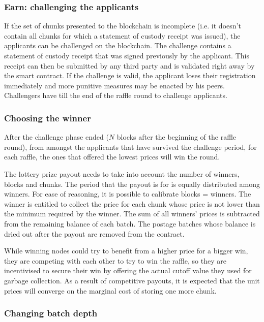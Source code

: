 \subsubsection{Earn: challenging the applicants}

If the set of chunks presented to the blockchain is incomplete (i.e. it doesn't contain all chunks for which a statement of custody receipt was issued), the applicants can be challenged on the blockchain. The challenge contains a statement of custody receipt that was signed previously by the applicant. This receipt can then be submitted by any third party and is validated right away by the smart contract. If the challenge is valid, the applicant loses their registration immediately and more punitive measures may be enacted by his peers. Challengers have till the end of the raffle round to challenge applicants.

\subsubsection{Choosing the winner}

After the challenge phase ended ($N$ blocks after the beginning of the raffle round), from amongst the applicants that have survived the challenge period, for each raffle, the ones that offered the lowest prices will win the round. 

The lottery prize payout needs to take into account the number of winners, blocks and chunks.
The period that the payout is for is equally distributed among winners. For ease of reasoning, it is possible to calibrate blocks = winners. The winner is entitled to collect the price for each chunk whose price is not lower than the minimum required by the winner. The sum of all winners' prices is subtracted from the remaining balance of each batch. The postage batches whose balance is dried out after the payout are removed from the contract.

While winning nodes could try to benefit from a higher price for a bigger win, they are competing with each other to try to win the raffle, so they are incentivised to secure their win by offering the actual cutoff value they used for garbage collection. As a result of competitive payouts, it is expected that the unit prices will converge on the marginal cost of storing one more chunk.

\subsubsection{Changing batch depth}

